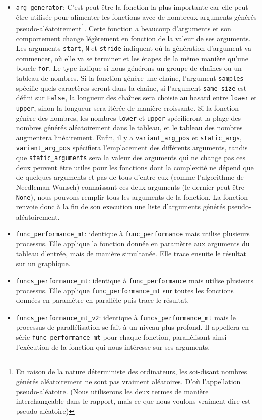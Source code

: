 \documentclass[12pt]{article}
\begin{document}
\begin{itemize}
    \item \texttt{arg\_generator}: C'est peut-être la fonction la plus importante car elle peut être utilisée pour alimenter les fonctions avec de nombreux arguments générés pseudo-aléatoirement\footnote{En raison de la nature déterministe des ordinateurs, les soi-disant nombres générés aléatoirement ne sont pas vraiment aléatoires. D'où l'appellation pseudo-aléatoire. (Nous utiliserons les deux termes de manière interchangeable dans le rapport, mais ce que nous voulons vraiment dire est pseudo-aléatoire)}. Cette fonction a beaucoup d'arguments et son comportement change légèrement en fonction de la valeur de ses arguments. Les arguments \texttt{start}, \texttt{N} et \texttt{stride} indiquent où la génération d'argument va commencer, où elle va se terminer et les étapes de la même manière qu'une boucle \texttt{for}. Le type indique si nous générons un groupe de chaînes ou un tableau de nombres. Si la fonction génère une chaîne, l'argument \texttt{samples} spécifie quels caractères seront dans la chaîne, si l'argument \texttt{same\_size} est défini sur \texttt{False}, la longueur des chaînes sera choisie au hasard entre \texttt{lower} et \texttt{upper}, sinon la longueur sera itérée de manière croissante. Si la fonction génère des nombres, les nombres \texttt{lower} et \texttt{upper} spécifieront la plage des nombres générés aléatoirement dans le tableau, et le tableau des nombres augmentera linéairement. Enfin, il y a \texttt{variant\_arg\_pos} et \texttt{static\_args}, \texttt{variant\_arg\_pos} spécifiera l'emplacement des différents arguments, tandis que \texttt{static\_arguments} sera la valeur des arguments qui ne change pas ces deux peuvent être utiles pour les fonctions dont la complexité ne dépend que de quelques arguments et pas de tous d'entre eux (comme l'algorithme de Needleman-Wunsch) connaissant ces deux arguments (le dernier peut être \texttt{None}), nous pouvons remplir tous les arguments de la fonction. La fonction renvoie donc à la fin de son execution une liste d'arguments générés pseudo-aléatoirement.
    \item \texttt{func\_performance\_mt}: identique à \texttt{func\_performance} mais utilise plusieurs processus. Elle applique la fonction donnée en paramètre aux arguments du tableau d'entrée, mais de manière simultanée. Elle trace ensuite le résultat sur un graphique.
    \item \texttt{funcs\_performance\_mt}: identique à \texttt{func\_performance} mais utilise plusieurs processus. Elle applique \texttt{func\_performance\_mt} sur toutes les fonctions données en paramètre en parallèle puis trace le résultat.
    \item \texttt{funcs\_performance\_mt\_v2}: identique à \texttt{funcs\_performance\_mt} mais le processus de parallélisation se fait à un niveau plus profond. Il appellera en série \texttt{func\_performance\_mt} pour chaque fonction, parallélisant ainsi l'exécution de la fonction qui nous intéresse sur ses arguments.
\end{itemize}
\end{document}
